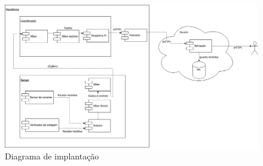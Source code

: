 \begin{figure}
\centering
\includegraphics[width=1\textwidth]{figuras/diagrama_implantacao.png}
\caption{\label{fig:diagrama_implantacao} Diagrama de implantação}
\end{figure}
